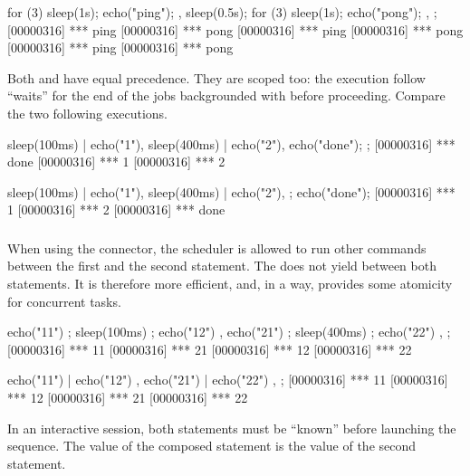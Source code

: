 \begin{urbiscript}[firstnumber=last]
{
  for (3)
  {
    sleep(1s);
    echo("ping");
  },
  sleep(0.5s);
  for (3)
  {
    sleep(1s);
    echo("pong");
  },
};
[00000316] *** ping
[00000316] *** pong
[00000316] *** ping
[00000316] *** pong
[00000316] *** ping
[00000316] *** pong
\end{urbiscript}

Both \samp{;} and \samp{,} have equal precedence.  They are scoped
too: the execution follow ``waits'' for the end of the jobs
backgrounded with \samp{,} before proceeding.  Compare the two
following executions.

\begin{urbiscript}[firstnumber=last]
{
  sleep(100ms) | echo("1"),
  sleep(400ms) | echo("2"),
  echo("done");
};
[00000316] *** done
[00000316] *** 1
[00000316] *** 2
\end{urbiscript}

\begin{urbiscript}[firstnumber=last]
{
  sleep(100ms) | echo("1"),
  sleep(400ms) | echo("2"),
};
echo("done");
[00000316] *** 1
[00000316] *** 2
[00000316] *** done
\end{urbiscript}


\subsubsection{\samp{|}}
When using the \samp{;} connector, the scheduler is allowed to run
other commands between the first and the second statement.  The
\samp{|} does not yield between both statements.  It is therefore more
efficient, and, in a way, provides some atomicity for concurrent tasks.

\begin{urbiscript}[firstnumber=last]
{
  { echo("11") ; sleep(100ms) ; echo("12") },
  { echo("21") ; sleep(400ms) ; echo("22") },
};
[00000316] *** 11
[00000316] *** 21
[00000316] *** 12
[00000316] *** 22
\end{urbiscript}

\begin{urbiscript}[firstnumber=last]
{
  { echo("11") | echo("12") },
  { echo("21") | echo("22") },
};
[00000316] *** 11
[00000316] *** 12
[00000316] *** 21
[00000316] *** 22
\end{urbiscript}

In an interactive session, both statements must be ``known'' before
launching the sequence.  The value of the composed statement is the
value of the second statement.

